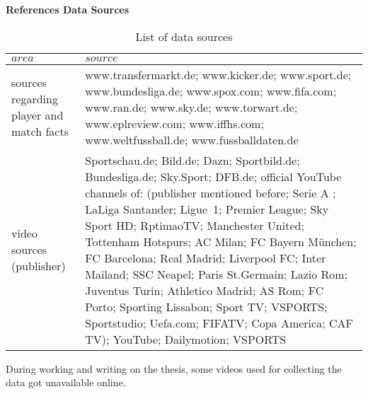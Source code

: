\documentclass[12pt,dvipsnames]{article}%
\begin{document}
\newpage

\large{\textbf{References Data Sources}}

\vspace{+0.5cm}

 \begin{table}[h]
\caption{List of data sources}
\centering
\begin{tabular}{ p{3.15cm} | p{11.15cm}  }
    $area$ & $source$   \\
   \hline

sources regarding player and match facts & www.transfermarkt.de; www.kicker.de; www.sport.de; www.bundesliga.de; www.spox.com; www.fifa.com; www.ran.de; www.sky.de; www.torwart.de; www.eplreview.com; www.iffhs.com; www.weltfussball.de; www.fussballdaten.de  \\

video sources (publisher)\footnotemark[4] & Sportschau.de; Bild.de; Dazn; Sportbild.de; Bundesliga.de; Sky.Sport; DFB.de; official YouTube channels of: (publisher mentioned before; Serie A ; LaLiga Santander; \mbox{Ligue 1}; Premier League; Sky Sport HD; RptimaoTV;  Manchester United; Tottenham Hotspurs; AC Milan; FC Bayern M{\"u}nchen; FC Barcelona; Real Madrid; Liverpool FC; Inter Mailand; SSC Neapel; Paris St.Germain; Lazio Rom; Juventus Turin; Athletico Madrid; AS Rom; FC Porto; Sporting Lissabon; Sport TV; VSPORTS; Sportstudio; Uefa.com; FIFATV; Copa America; CAF TV);  YouTube; Dailymotion; VSPORTS

 \end{tabular}
 
\vspace{+0.5cm}
 
\footnotemark[4] During working and writing on the thesis, some videos used for collecting the 
 \newline 
 \hspace*{-91mm} data got  unavailable online. 
 
 \end{table}

 \pagebreak
\end{document}
